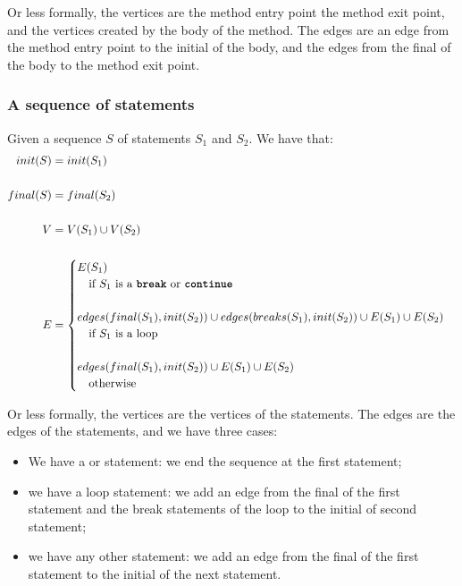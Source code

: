 Or less formally, the vertices are the method entry point the method exit point, 
and the vertices created by the body of the method. The edges are an edge from
the method entry point to the initial of the body, and the edges from the final
of the body to the method exit point.

\subsubsection*{A sequence of statements}
Given a sequence $S$ of statements $S_1$ and $S_2$. We have that:
\begin{align*}
    init(S)  &= init(S_1) \\ \\
    final(S) &= final(S_2) \\ \\
    V &= V(S_1) \cup V(S_2) \\ \\
    E &= 
    \begin{cases}
        E(S_1) 
            & \\ \quad \text{if } S_1 \text{ is a \javainline{break} or \javainline{continue}} \\ \\
        edges(final(S_1), init(S_2)) \cup edges(breaks(S_1), init(S_2)) \cup E(S_1) \cup E(S_2) 
            & \\ \quad \text{if } S_1 \text{ is a loop} \\ \\
        edges(final(S_1), init(S_2))  \cup E(S_1) \cup E(S_2) 
            & \\ \quad \text{otherwise}
    \end{cases}
\end{align*}

Or less formally, the vertices are the vertices of the statements. The edges are
the edges of the statements, and we have three cases:
\begin{itemize}
    \item We have a  or  statement: we
    end the sequence at the first statement;
    \item we have a loop statement: we add an edge from the final of the first 
    statement and the break statements of the loop to the initial of second 
    statement;
    \item we have any other statement: we add an edge from the final of the first
    statement to the initial of the next statement.
\end{itemize}

